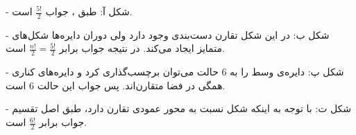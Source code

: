 -
شکل
آ:
\p
طبق  ،
جواب 
$\frac{5!}{2}$
است.

-
شکل
ب:
\p
در این شکل تقارن دست‌بندی وجود دارد ولی دوران دایره‌ها شکل‌های متمایز ایجاد می‌کند.
در نتیجه جواب برابر
$\frac{n!}{2} = \frac{5!}{2}$
است.

-
شکل
پ:
\p
دایره‌ی وسط را به 6 حالت می‌توان برچسب‌گذاری کرد و دایره‌های کناری همگی در فضا متقارن‌اند. پس جواب این حالت 6 است.

-
شکل 
ت:
\p
با توجه به اینکه شکل نسبت به محور عمودی تقارن دارد، طبق اصل تقسیم جواب برابر 
$\frac{6!}{2}$
است.